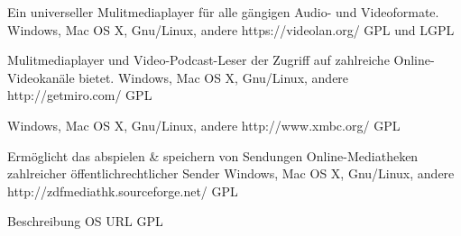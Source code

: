 \documentclass[12pt,a4paper,landscape,twocolumn]{article}
\begin{document}


{Ein universeller Mulitmediaplayer für alle gängigen Audio- und Videoformate.}
{Windows, Mac OS X, Gnu/Linux, andere}
{https://videolan.org/}
{GPL und LGPL}

{Mulitmediaplayer und Video-Podcast-Leser der Zugriff auf zahlreiche Online-Videokanäle bietet.}
{Windows, Mac OS X, Gnu/Linux, andere}
{http://getmiro.com/}
{GPL}

{}
{Windows, Mac OS X, Gnu/Linux, andere}
{http://www.xmbc.org/}
{GPL}

{Ermöglicht das abspielen \& speichern von Sendungen Online-Mediatheken zahlreicher öffentlichrechtlicher Sender}
{Windows, Mac OS X, Gnu/Linux, andere}
{http://zdfmediathk.sourceforge.net/}
{GPL}


\newpage %


{Beschreibung}
{OS}
{URL}
{GPL}

\end{document}
